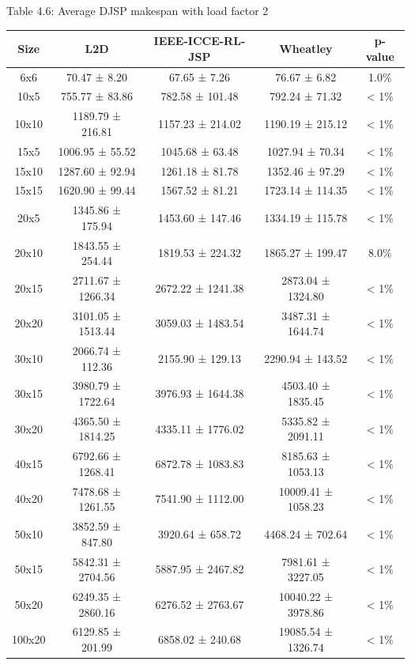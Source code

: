 \begin{table}[H]
    Table 4.6: Average DJSP makespan with load factor 2\\
    \vspace{1mm}
    \footnotesize 
    \begin{tabular}{ccccc}
    \toprule
    Size & L2D & IEEE-ICCE-RL-JSP & Wheatley & p-value \\
    \midrule
    6x6 & 70.47 ± 8.20 & 67.65 ± 7.26 & 76.67 ± 6.82 & 1.0$\%$ \\
    10x5 & 755.77 ± 83.86 & 782.58 ± 101.48 & 792.24 ± 71.32 & < 1$\%$ \\
    10x10 & 1189.79 ± 216.81 & 1157.23 ± 214.02 & 1190.19 ± 215.12 & < 1$\%$ \\
    15x5 & 1006.95 ± 55.52 & 1045.68 ± 63.48 & 1027.94 ± 70.34 & < 1$\%$ \\
    15x10 & 1287.60 ± 92.94 & 1261.18 ± 81.78 & 1352.46 ± 97.29 & < 1$\%$ \\
    15x15 & 1620.90 ± 99.44 & 1567.52 ± 81.21 & 1723.14 ± 114.35 & < 1$\%$ \\
    20x5 & 1345.86 ± 175.94 & 1453.60 ± 147.46 & 1334.19 ± 115.78 & < 1$\%$ \\
    20x10 & 1843.55 ± 254.44 & 1819.53 ± 224.32 & 1865.27 ± 199.47 & 8.0$\%$ \\
    20x15 & 2711.67 ± 1266.34 & 2672.22 ± 1241.38 & 2873.04 ± 1324.80 & < 1$\%$ \\
    20x20 & 3101.05 ± 1513.44 & 3059.03 ± 1483.54 & 3487.31 ± 1644.74 & < 1$\%$ \\
    30x10 & 2066.74 ± 112.36 & 2155.90 ± 129.13 & 2290.94 ± 143.52 & < 1$\%$ \\
    30x15 & 3980.79 ± 1722.64 & 3976.93 ± 1644.38 & 4503.40 ± 1835.45 & < 1$\%$ \\
    30x20 & 4365.50 ± 1814.25 & 4335.11 ± 1776.02 & 5335.82 ± 2091.11 & < 1$\%$ \\
    40x15 & 6792.66 ± 1268.41 & 6872.78 ± 1083.83 & 8185.63 ± 1053.13 & < 1$\%$ \\
    40x20 & 7478.68 ± 1261.55 & 7541.90 ± 1112.00 & 10009.41 ± 1058.23 & < 1$\%$ \\
    50x10 & 3852.59 ± 847.80 & 3920.64 ± 658.72 & 4468.24 ± 702.64 & < 1$\%$ \\
    50x15 & 5842.31 ± 2704.56 & 5887.95 ± 2467.82 & 7981.61 ± 3227.05 & < 1$\%$ \\
    50x20 & 6249.35 ± 2860.16 & 6276.52 ± 2763.67 & 10040.22 ± 3978.86 & < 1$\%$ \\
    100x20 & 6129.85 ± 201.99 & 6858.02 ± 240.68 & 19085.54 ± 1326.74 & < 1$\%$ \\
    \bottomrule
    \end{tabular}
\end{table}
    
